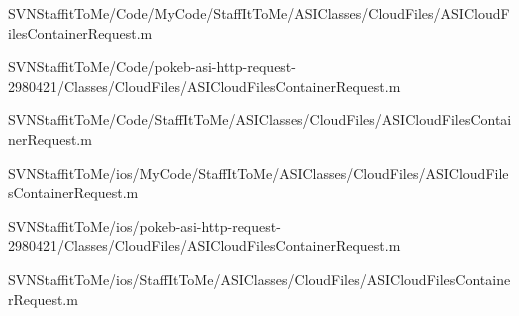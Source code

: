 \begin{DoxyCompactItemize}
\-S\-V\-N\-Staffit\-To\-Me/\-Code/\-My\-Code/\-Staff\-It\-To\-Me/\-A\-S\-I\-Classes/\-Cloud\-Files/\-A\-S\-I\-Cloud\-Files\-Container\-Request.\-m\item 
\-S\-V\-N\-Staffit\-To\-Me/\-Code/pokeb-\/asi-\/http-\/request-\/2980421/\-Classes/\-Cloud\-Files/\-A\-S\-I\-Cloud\-Files\-Container\-Request.\-m\item 
\-S\-V\-N\-Staffit\-To\-Me/\-Code/\-Staff\-It\-To\-Me/\-A\-S\-I\-Classes/\-Cloud\-Files/\-A\-S\-I\-Cloud\-Files\-Container\-Request.\-m\item 
\-S\-V\-N\-Staffit\-To\-Me/ios/\-My\-Code/\-Staff\-It\-To\-Me/\-A\-S\-I\-Classes/\-Cloud\-Files/\-A\-S\-I\-Cloud\-Files\-Container\-Request.\-m\item 
\-S\-V\-N\-Staffit\-To\-Me/ios/pokeb-\/asi-\/http-\/request-\/2980421/\-Classes/\-Cloud\-Files/\-A\-S\-I\-Cloud\-Files\-Container\-Request.\-m\item 
\-S\-V\-N\-Staffit\-To\-Me/ios/\-Staff\-It\-To\-Me/\-A\-S\-I\-Classes/\-Cloud\-Files/\-A\-S\-I\-Cloud\-Files\-Container\-Request.\-m\end{DoxyCompactItemize}
